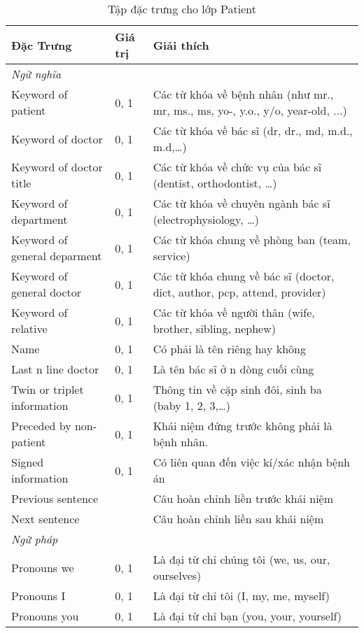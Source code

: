 \begin{table}[th]
\centering{}
\caption{Tập đặc trưng cho lớp Patient \label{tab:PatientFeatures}}
\footnotesize\sffamily

\begin{tabularx}{\textwidth}{@{}P{\raggedright}{0.3}lL@{}}
\toprule 
\textbf{Đặc Trưng} & \textbf{Giá trị} & \textbf{Giải thích}\\
\midrule
\emph{Ngữ nghĩa}\\
\quad Keyword of patient & 0, 1 & Các từ khóa về bệnh nhân (như mr., mr, ms., ms, yo-, y.o., y/o, year-old, ...)\\
\quad Keyword of doctor & 0, 1 & Các từ khóa về bác sĩ (dr, dr., md, m.d., m.d,…)\\
\quad Keyword of doctor title & 0, 1 & Các từ khóa về chức vụ của bác sĩ (dentist, orthodontist, …)\\
\quad Keyword of department  & 0, 1 & Các từ khóa về chuyên ngành bác sĩ (electrophysiology, …)\\
\quad Keyword of general deparment & 0, 1 & Các từ khóa chung về phòng ban (team, service)\\
\quad Keyword of general doctor & 0, 1 & Các từ khóa chung về bác sĩ (doctor, dict, author, pcp, attend, provider)\\
\quad Keyword of relative & 0, 1 & Các từ khóa về người thân (wife, brother, sibling, nephew)\\
\quad Name & 0, 1 & Có phải là tên riêng hay không\\
\quad Last n line doctor & 0, 1 & Là tên bác sĩ ở n dòng cuối cùng\\
\quad Twin or triplet information & 0, 1 & Thông tin về cặp sinh đôi, sinh ba (baby 1, 2, 3,…)\\
\quad Preceded by non-patient & 0, 1 & Khái niệm đứng trước không phải là bệnh nhân.\\
\quad Signed information  & 0, 1 & Có liên quan đến việc kí/xác nhận bệnh án\\
\quad Previous sentence &  & Câu hoàn chỉnh liền trước khái niệm\\
\quad Next sentence &  & Câu hoàn chỉnh liền sau khái niệm\\
\emph{Ngữ pháp}\\
\quad Pronouns we & 0, 1 & Là đại từ chỉ chúng tôi (we, us, our, ourselves)\\
\quad Pronouns I & 0, 1 & Là đại từ chỉ tôi (I, my, me, myself)\\
\quad Pronouns you & 0, 1 & Là đại từ chỉ bạn (you, your, yourself)\\

\end{tabularx}
\end{table}
